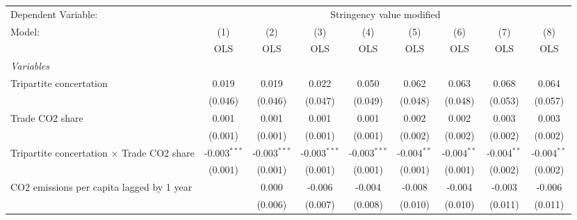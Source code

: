 
\begingroup
\centering
\begin{tabular}{lcccccccc}
   \toprule
   Dependent Variable: & \multicolumn{8}{c}{Stringency value modified}\\
   Model:                                                     & (1)            & (2)            & (3)            & (4)            & (5)           & (6)           & (7)           & (8)\\  
                                                              &  OLS           & OLS            & OLS            & OLS            & OLS           & OLS           & OLS           & OLS\\  
   \midrule
   \emph{Variables}\\
   Tripartite concertation                                    & 0.019          & 0.019          & 0.022          & 0.050          & 0.062         & 0.063         & 0.068         & 0.064\\   
                                                              & (0.046)        & (0.046)        & (0.047)        & (0.049)        & (0.048)       & (0.048)       & (0.053)       & (0.057)\\   
   Trade CO2 share                                            & 0.001          & 0.001          & 0.001          & 0.001          & 0.002         & 0.002         & 0.003         & 0.003\\   
                                                              & (0.001)        & (0.001)        & (0.001)        & (0.001)        & (0.002)       & (0.002)       & (0.002)       & (0.002)\\   
   Tripartite concertation $\times$ Trade CO2 share           & -0.003$^{***}$ & -0.003$^{***}$ & -0.003$^{***}$ & -0.003$^{***}$ & -0.004$^{**}$ & -0.004$^{**}$ & -0.004$^{**}$ & -0.004$^{**}$\\   
                                                              & (0.001)        & (0.001)        & (0.001)        & (0.001)        & (0.001)       & (0.001)       & (0.002)       & (0.002)\\   
   CO2 emissions per capita lagged by 1 year                  &                & 0.000          & -0.006         & -0.004         & -0.008        & -0.004        & -0.003        & -0.006\\   
                                                              &                & (0.006)        & (0.007)        & (0.008)        & (0.010)       & (0.010)       & (0.011)       & (0.011)\\   

\end{tabular}
